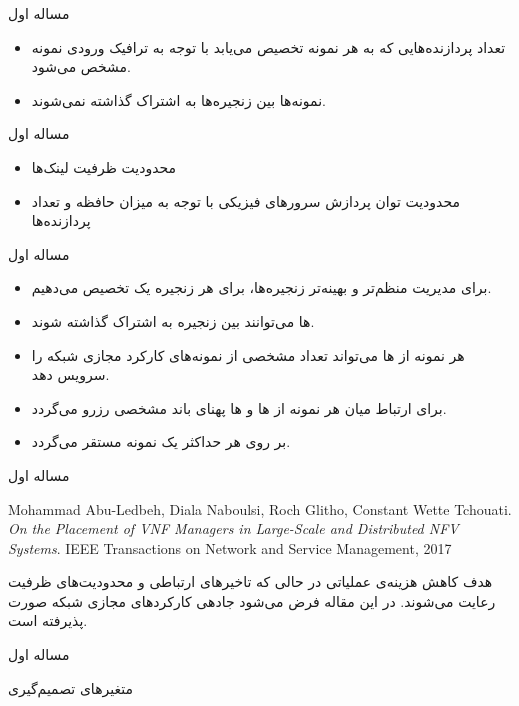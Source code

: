 \documentclass{beamer}
\makeatletter
\newcommand{\RTList}{\raggedleft\rightskip\@totalleftmargin}
\makeatother
\begin{document}
\begin{persian}
\begin{frame}{مساله اول}
\begin{itemize}
		\item تعداد پردازنده‌هایی که به هر نمونه تخصیص می‌یابد با توجه به ترافیک ورودی نمونه مشخص می‌شود.
		\item نمونه‌ها بین زنجیره‌ها به اشتراک گذاشته نمی‌شوند.
	\end{itemize}
\end{frame}
\begin{frame}{مساله اول}
	\begin{itemize}\RTList{}
		\item محدودیت ظرفیت لینک‌ها
		\item محدودیت توان پردازش سرورهای فیزیکی با توجه به میزان حافظه و تعداد پردازنده‌ها
	\end{itemize}
\end{frame}
\begin{frame}{مساله اول}
	\begin{itemize}\RTList{}
    	\item برای مدیریت منظم‌تر و بهینه‌تر زنجیره‌ها، برای هر زنجیره یک  تخصیص می‌دهیم.
		\item {}ها می‌توانند بین زنجیره به اشتراک گذاشته شوند.
		\item هر نمونه از ها می‌تواند تعداد مشخصی از نمونه‌های کارکرد مجازی شبکه را سرویس دهد. 
		\item برای ارتباط میان هر نمونه از ها و ها پهنای باند مشخصی رزرو می‌گردد.
		\item بر روی هر  حداکثر یک نمونه  مستقر می‌گردد.
	\end{itemize}
\end{frame}
\begin{frame}{مساله اول}
	\begin{latin}\begin{thebibliography}{9}
		Mohammad Abu-Ledbeh, Diala Naboulsi, Roch Glitho, Constant Wette Tchouati.
		\textit{On the Placement of VNF Managers in Large-Scale and Distributed NFV Systems}. 
		IEEE Transactions on Network and Service Management, 2017
	\end{thebibliography}\end{latin}
	\par
	هدف کاهش هزینه‌ی عملیاتی در حالی که تاخیرهای ارتباطی و محدودیت‌های ظرفیت رعایت می‌شوند.
	در این مقاله فرض می‌شود جادهی کارکردهای مجازی شبکه صورت پذیرفته است.
\end{frame}
\begin{frame}{مساله اول}
	\par
	متغیرهای تصمیم‌گیری
	\begin{latin}\begin{tabular}{c p{10cm}}

\end{tabular}
\end{latin}
\end{frame}
\end{persian}
\end{document}
